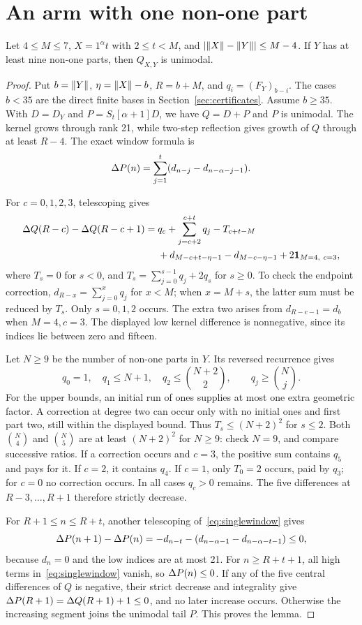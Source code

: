 \section{An arm with one non-one part}\label{sec:single}
\begin{lemma}\label{lem:single}
Let $4\le M\le7$, $X=1^\alpha t$ with $2\le t<M$, and $|\lVert X\rVert-\lVert Y\rVert|\le M-4$. If $Y$ has at least nine non-one parts, then $Q_{X,Y}$ is unimodal.
\end{lemma}
\begin{proof}
Put $b=\lVert Y\rVert$, $\eta=\lVert X\rVert-b$, $R=b+M$, and $q_i=(F_Y)_{b-i}$. The cases $b<35$ are the direct finite bases in Section~\ref{sec:certificates}. Assume $b\ge35$. With $D=D_Y$ and $P=S_t[\alpha+1]D$, we have $Q=D+P$ and $P$ is unimodal. The kernel grows through rank 21, while two-step reflection gives growth of $Q$ through at least $R-4$. The exact window formula is
\begin{equation}\label{eq:singlewindow}
 \Delta P(n)=\sum_{j=1}^t(d_{n-j}-d_{n-\alpha-j-1}).
\end{equation}

For $c=0,1,2,3$, telescoping gives
\begin{align}\label{eq:singlegaps}
 \Delta Q(R-c)-\Delta Q(R-c+1)
 ={}&q_c+\sum_{j=c+2}^{c+t}q_j-T_{c+t-M}\notag\\
 &+d_{M-c+t-\eta-1}-d_{M-c-\eta-1}
   +2\mathbf1_{M=4,\ c=3},
\end{align}
where $T_s=0$ for $s<0$, and $T_s=\sum_{j=0}^{s-1}q_j+2q_s$ for $s\ge0$. To check the endpoint correction, $d_{R-x}=\sum_{j=0}^xq_j$ for $x<M$; when $x=M+s$, the latter sum must be reduced by $T_s$. Only $s=0,1,2$ occurs. The extra two arises from $d_{R-c-1}=d_b$ when $M=4,c=3$. The displayed low kernel difference is nonnegative, since its indices lie between zero and fifteen.

Let $N\ge9$ be the number of non-one parts in $Y$. Its reversed recurrence gives
\[
 q_0=1,\quad q_1\le N+1,\quad q_2\le\binom{N+2}{2},
 \qquad q_j\ge\binom Nj.
\]
For the upper bounds, an initial run of ones supplies at most one extra geometric factor. A correction at degree two can occur only with no initial ones and first part two, still within the displayed bound. Thus $T_s\le(N+2)^2$ for $s\le2$. Both $\binom N4$ and $\binom N5$ are at least $(N+2)^2$ for $N\ge9$: check $N=9$, and compare successive ratios. If a correction occurs and $c=3$, the positive sum contains $q_5$ and pays for it. If $c=2$, it contains $q_4$. If $c=1$, only $T_0=2$ occurs, paid by $q_3$; for $c=0$ no correction occurs. In all cases $q_c>0$ remains. The five differences at $R-3,\ldots,R+1$ therefore strictly decrease.

For $R+1\le n\le R+t$, another telescoping of~\eqref{eq:singlewindow} gives
\[
 \Delta P(n+1)-\Delta P(n)
 =-d_{n-t}-(d_{n-\alpha-1}-d_{n-\alpha-t-1})\le0,
\]
because $d_n=0$ and the low indices are at most 21. For $n\ge R+t+1$, all high terms in~\eqref{eq:singlewindow} vanish, so $\Delta P(n)\le0$. If any of the five central differences of $Q$ is negative, their strict decrease and integrality give $\Delta P(R+1)=\Delta Q(R+1)+1\le0$, and no later increase occurs. Otherwise the increasing segment joins the unimodal tail $P$. This proves the lemma.
\end{proof}
